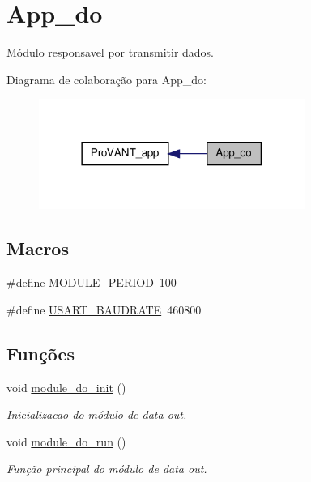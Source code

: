 \hypertarget{group__app__do}{\section{App\-\_\-do}
\label{group__app__do}
}


Módulo responsavel por transmitir dados.  


Diagrama de colaboração para App\-\_\-do\-:
\nopagebreak
\begin{figure}[H]
\begin{center}
\leavevmode
\includegraphics[width=246pt]{group__app__do}
\end{center}
\end{figure}
\subsection*{Macros}
\begin{DoxyCompactItemize}
\item 
\#define \hyperlink{group__app__do_ga0ac6c9f2991b096e49c354e5cce6fae0}{M\-O\-D\-U\-L\-E\-\_\-\-P\-E\-R\-I\-O\-D}~100
\item 
\#define \hyperlink{group__app__do_ga6a53a6c94a70cc286e300a0ea8f46ba4}{U\-S\-A\-R\-T\-\_\-\-B\-A\-U\-D\-R\-A\-T\-E}~460800
\end{DoxyCompactItemize}
\subsection*{Funções}
\begin{DoxyCompactItemize}
\item 
void \hyperlink{group__app__do_ga901c023651503207f5cfd8cdb8c305b3}{module\-\_\-do\-\_\-init} ()
\begin{DoxyCompactList}\small\item\em Inicializacao do módulo de data out. \end{DoxyCompactList}\item 
void \hyperlink{group__app__do_ga1f08b4b431624465a47f47eca0520253}{module\-\_\-do\-\_\-run} ()
\begin{DoxyCompactList}\small\item\em Função principal do módulo de data out. \end{DoxyCompactList}\end{DoxyCompactItemize}
